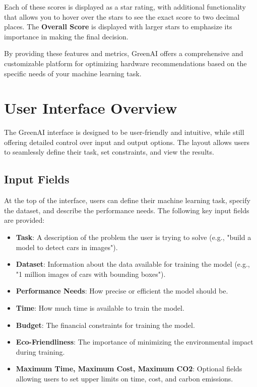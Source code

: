\documentclass{report}
\begin{document}
Each of these scores is displayed as a star rating, with additional functionality that allows you to hover over the stars to see the exact score to two decimal places. The \textbf{Overall Score} is displayed with larger stars to emphasize its importance in making the final decision.

By providing these features and metrics, GreenAI offers a comprehensive and customizable platform for optimizing hardware recommendations based on the specific needs of your machine learning task.



\chapter{User Interface Overview}

The GreenAI interface is designed to be user-friendly and intuitive, while still offering detailed control over input and output options. The layout allows users to seamlessly define their task, set constraints, and view the results.

\section{Input Fields}
At the top of the interface, users can define their machine learning task, specify the dataset, and describe the performance needs. The following key input fields are provided:

\begin{itemize}
    \item \textbf{Task}: A description of the problem the user is trying to solve (e.g., "build a model to detect cars in images").
    \item \textbf{Dataset}: Information about the data available for training the model (e.g., "1 million images of cars with bounding boxes").
    \item \textbf{Performance Needs}: How precise or efficient the model should be.
    \item \textbf{Time}: How much time is available to train the model.
    \item \textbf{Budget}: The financial constraints for training the model.
    \item \textbf{Eco-Friendliness}: The importance of minimizing the environmental impact during training.
    \item \textbf{Maximum Time, Maximum Cost, Maximum CO2}: Optional fields allowing users to set upper limits on time, cost, and carbon emissions.
\end{itemize}
\end{document}
